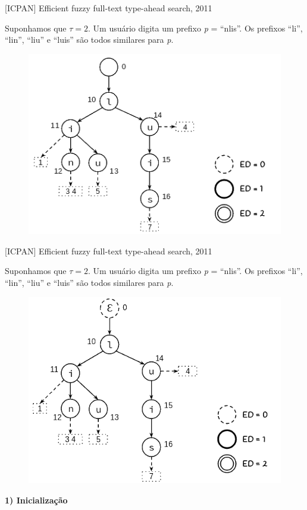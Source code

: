 \documentclass[11pt]{beamer}
\begin{document}
\begin{frame}{[ICPAN] Efficient fuzzy full-text type-ahead search, 2011}
    
    \small
    Suponhamos que $\tau = 2$. Um usuário digita um prefixo \textit{p} = ``nlis''. Os prefixos ``li'', ``lin'', ``liu'' e ``luis'' são todos similares para \textit{p}. \pause

    \begin{figure}
      \includegraphics[scale=0.50]{pictures/ipcan_default.png}
      \centering
    \end{figure}
    
\end{frame}

\begin{frame}{[ICPAN] Efficient fuzzy full-text type-ahead search, 2011}
    
    \small
    Suponhamos que $\tau = 2$. Um usuário digita um prefixo \textit{p} = ``nlis''. Os prefixos ``li'', ``lin'', ``liu'' e ``luis'' são todos similares para \textit{p}.

    \begin{figure}
      \includegraphics[scale=0.42]{pictures/icpan_1.png}
      \centering
    \end{figure}
    
    \textbf{1) Inicialização}
    
\end{frame}
\end{document}
